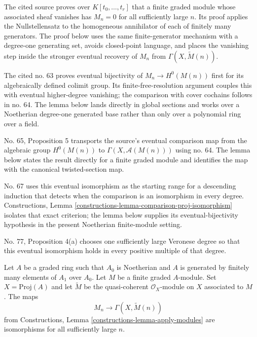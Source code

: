 \begin{lemma}
\label{lemma-recover-tail-graded-module}
\begin{reference}
\cite[Chapter III, \S 2, no. 58, Proposition 5, pp. 250--251]{FAC}
\cite[Chapter III, \S 3, no. 63, Proposition 3(c),
pp. 256--257]{FAC}
\cite[Chapter III, \S 3, no. 65, Proposition 5, p. 258]{FAC}
\cite[Chapter III, \S 3, no. 67, proof of Proposition 9,
pp. 260--261]{FAC}
\cite[Chapter III, \S 5, no. 77, proof of Proposition 4(a),
p. 272]{FAC}
\end{reference}
\begin{history}
The cited source proves over $K[t_0, \ldots, t_r]$ that a finite graded
module whose associated sheaf vanishes has $M_n=0$ for all sufficiently
large $n$. Its proof applies the Nullstellensatz to the homogeneous
annihilator of each of finitely many generators. The proof below uses the
same finite-generator mechanism with a degree-one generating set, avoids
closed-point language, and places the vanishing step inside the stronger
eventual recovery of $M_n$ from $\Gamma(X, \widetilde M(n))$.

The cited no. 63 proves eventual bijectivity of
$M_n \to H^0(M(n))$ first for its algebraically defined colimit group. Its
finite-free-resolution argument couples this with eventual higher-degree
vanishing; the comparison with cover cochains follows in no. 64. The lemma
below lands directly in global sections and works over a Noetherian degree-one
generated base rather than only over a polynomial ring over a field.

No. 65, Proposition 5 transports the source's eventual comparison map from
the algebraic group $H^0(M(n))$ to
$\Gamma(X, \mathcal{A}(M(n)))$ using no. 64. The lemma below states the
result directly for a finite graded module and identifies the map with the
canonical twisted-section map.

No. 67 uses this eventual isomorphism as the starting range for a descending
induction that detects when the comparison is an isomorphism in every degree.
Constructions, Lemma
\ref{constructions-lemma-comparison-proj-isomorphism} isolates that exact
criterion; the lemma below supplies its eventual-bijectivity hypothesis in
the present Noetherian finite-module setting.

No. 77, Proposition 4(a) chooses one sufficiently large Veronese degree so
that this eventual isomorphism holds in every positive multiple of that
degree.
\end{history}
Let $A$ be a graded ring such that $A_0$ is Noetherian and $A$ is generated
by finitely many elements of $A_1$ over $A_0$. Let $M$ be a
finite graded $A$-module. Set $X = \text{Proj}(A)$ and let $\widetilde{M}$
be the quasi-coherent $\mathcal{O}_X$-module on $X$ associated to $M$.
The maps
$$
M_n \longrightarrow \Gamma(X, \widetilde{M}(n))
$$
from Constructions, Lemma \ref{constructions-lemma-apply-modules}
are isomorphisms for all sufficiently large $n$.
\end{lemma}

